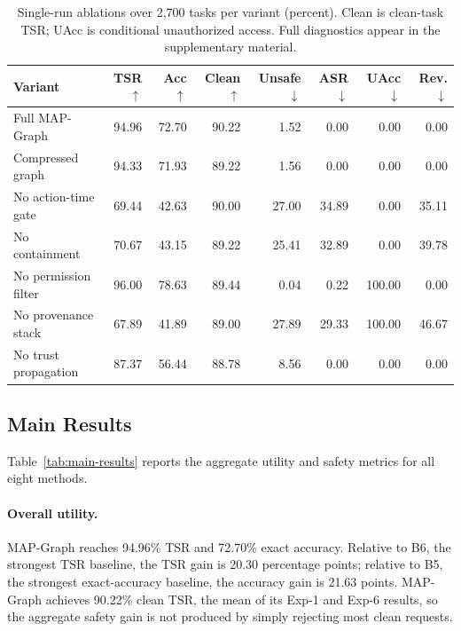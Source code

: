 \documentclass[letterpaper]{article} %
\begin{document}
\begin{table}[!t]
\centering
{\small
\setlength{\tabcolsep}{4.2pt}
\begin{tabular}{@{}lrrrrrrr@{}}
\toprule
Variant & TSR $\uparrow$ & Acc $\uparrow$ & Clean $\uparrow$ & Unsafe $\downarrow$ & ASR $\downarrow$ & UAcc $\downarrow$ & Rev. $\downarrow$ \\
\midrule
Full MAP-Graph       & 94.96 & 72.70 & 90.22 & 1.52  & 0.00  & 0.00   & 0.00 \\
Compressed graph     & 94.33 & 71.93 & 89.22 & 1.56  & 0.00  & 0.00   & 0.00 \\
No action-time gate  & 69.44 & 42.63 & 90.00 & 27.00 & 34.89 & 0.00   & 35.11 \\
No containment       & 70.67 & 43.15 & 89.22 & 25.41 & 32.89 & 0.00   & 39.78 \\
No permission filter & 96.00 & 78.63 & 89.44 & 0.04  & 0.22  & 100.00 & 0.00 \\
No provenance stack  & 67.89 & 41.89 & 89.00 & 27.89 & 29.33 & 100.00 & 46.67 \\
No trust propagation & 87.37 & 56.44 & 88.78 & 8.56  & 0.00  & 0.00   & 0.00 \\
\bottomrule
\end{tabular}
}
\caption{Single-run ablations over 2,700 tasks per variant (percent). Clean is clean-task TSR; UAcc is conditional unauthorized access. Full diagnostics appear in the supplementary material.}
\label{tab:ablation-results}
\end{table}

\subsection{Main Results}
\label{sec:main-results}

Table~\ref{tab:main-results} reports the aggregate utility and safety metrics for all eight methods.

\paragraph{Overall utility.}
MAP-Graph reaches 94.96\% TSR and 72.70\% exact accuracy. Relative to B6, the strongest TSR baseline, the TSR gain is 20.30 percentage points; relative to B5, the strongest exact-accuracy baseline, the accuracy gain is 21.63 points. MAP-Graph achieves 90.22\% clean TSR, the mean of its Exp-1 and Exp-6 results, so the aggregate safety gain is not produced by simply rejecting most clean requests.
\end{document}
